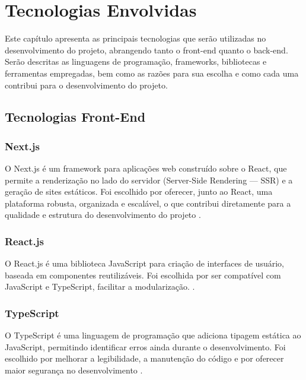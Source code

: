 \chapter{Tecnologias Envolvidas} \label{cha:tecnologias}

Este capítulo apresenta as principais tecnologias que serão utilizadas no desenvolvimento do projeto, abrangendo tanto o front-end quanto o back-end. Serão descritas as linguagens de programação, frameworks, bibliotecas e ferramentas empregadas, bem como as razões para sua escolha e como cada uma contribui para o desenvolvimento do projeto.

\section{Tecnologias Front-End}

\subsection{Next.js}

O Next.js é um framework para aplicações web construído sobre o React, que permite a renderização no lado do servidor (Server-Side Rendering — SSR) e a geração de sites estáticos. Foi escolhido por oferecer, junto ao React, uma plataforma robusta, organizada e escalável, o que contribui diretamente para a qualidade e estrutura do desenvolvimento do projeto \cite{nextjs}.

\subsection{React.js}

O React.js é uma biblioteca JavaScript para criação de interfaces de usuário, baseada em componentes reutilizáveis. Foi escolhida por ser compatível com JavaScript e TypeScript, facilitar a modularização. \cite{reactjs}.

\subsection{TypeScript}

O TypeScript é uma linguagem de programação que adiciona tipagem estática ao JavaScript, permitindo identificar erros ainda durante o desenvolvimento. Foi escolhido por melhorar a legibilidade, a manutenção do código e por oferecer maior segurança no desenvolvimento \cite{typescript}.

